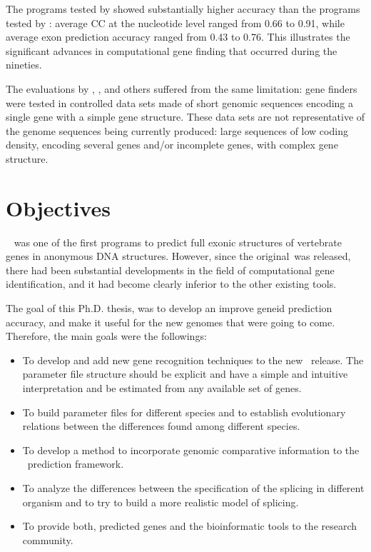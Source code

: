The programs tested by \cite{rogic:2001a} showed substantially higher
accuracy than the programs tested by \cite{burset:1996a}:
average CC at the nucleotide level ranged from 0.66 to 0.91, while
average exon prediction accuracy ranged from 0.43 to 0.76. This
illustrates the significant advances in computational gene finding that
occurred during the nineties.

The evaluations by \cite{burset:1996a}, \cite{rogic:2001a}, and others
suffered from the same limitation: gene finders were tested in
controlled data sets made of short genomic sequences encoding a single
gene with a simple gene structure. These data sets are not
representative of the genome sequences being currently produced: large
sequences of low coding density, encoding several genes and/or
incomplete genes, with complex gene structure. 





\newpage
\chapter{Objectives} 

\geneid\ \citep{guigo:1992a} was one of the first programs to predict
full exonic structures of vertebrate genes in anonymous DNA
structures. However, since the original\geneid\ was released, there had
been substantial developments in the field of computational gene
identification, and it had become clearly inferior to the other
existing tools.

The goal of this Ph.D. thesis, was to develop an improve geneid
prediction accuracy, and make it useful for the new genomes that were
going to come. Therefore, the main goals were the followings:

\begin{itemize}

\item To develop and add new gene recognition techniques to the new \geneid\ 
release. The parameter file structure should be explicit and have a
simple and intuitive interpretation and be estimated from any
available set of genes.

\item To build parameter files for different species and to establish
evolutionary relations between the differences found among different
species.

\item To develop a method to incorporate genomic comparative information
to the \geneid\ prediction framework.

\item To analyze the differences between the specification of 
the splicing in different organism and to try to build a more
realistic model of splicing.

\item To provide both, predicted genes and the bioinformatic tools to
the research community.

\end{itemize}

